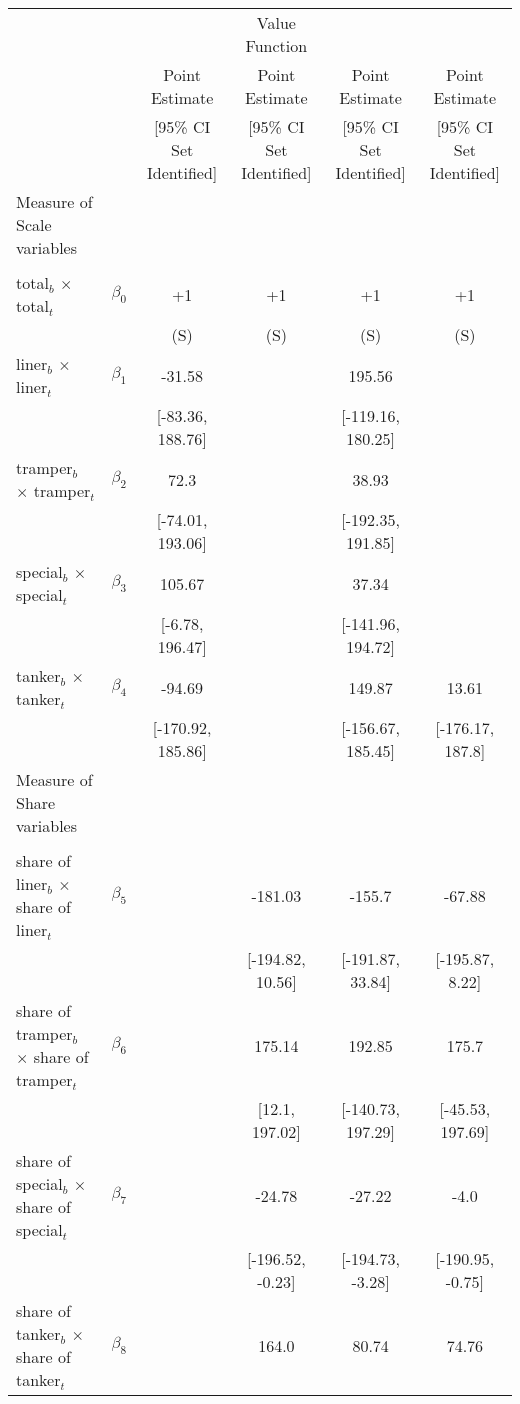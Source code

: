 \begin{tabular}{@{\extracolsep{5pt}}lccccc}
\toprule 
 &  &  & Value Function &  &  \\
 &  & Point Estimate & Point Estimate & Point Estimate & Point Estimate \\
 &  & [95\% CI Set Identified] & [95\% CI Set Identified] & [95\% CI Set Identified] & [95\% CI Set Identified] \\
\midrule 
Measure of Scale variables &  &  &  &  &  \\
 &  &  &  &  \\
total$_{b}$ $\times$ total$_{t}$ & $\beta_0$ & +1 & +1 & +1 & +1 \\
 &  & (S) & (S) & (S) & (S) \\
liner$_{b}$ $\times$ liner$_{t}$ & $\beta_1$ & -31.58 &  & 195.56 &  \\
 &  & [-83.36, 188.76] &  & [-119.16, 180.25] &  \\
tramper$_{b}$ $\times$ tramper$_{t}$ & $\beta_2$ & 72.3 &  & 38.93 &  \\
 &  & [-74.01, 193.06] &  & [-192.35, 191.85] &  \\
special$_{b}$ $\times$ special$_{t}$ & $\beta_3$ & 105.67 &  & 37.34 &  \\
 &  & [-6.78, 196.47] &  & [-141.96, 194.72] &  \\
tanker$_{b}$ $\times$ tanker$_{t}$ & $\beta_4$ & -94.69 &  & 149.87 & 13.61 \\
 &  & [-170.92, 185.86] &  & [-156.67, 185.45] & [-176.17, 187.8] \\
Measure of Share variables &  &  &  &  &  \\
 &  &  &  &  &  \\
share of liner$_{b}$ $\times$ share of liner$_{t}$ & $\beta_5$ &  & -181.03 & -155.7 & -67.88 \\
 &  &  & [-194.82, 10.56] & [-191.87, 33.84] & [-195.87, 8.22] \\
share of tramper$_{b}$ $\times$ share of tramper$_{t}$ & $\beta_6$ &  & 175.14 & 192.85 & 175.7 \\
 &  &  & [12.1, 197.02] & [-140.73, 197.29] & [-45.53, 197.69] \\
share of special$_{b}$ $\times$ share of special$_{t}$ & $\beta_7$ &  & -24.78 & -27.22 & -4.0 \\
 &  &  & [-196.52, -0.23] & [-194.73, -3.28] & [-190.95, -0.75] \\
share of tanker$_{b}$ $\times$ share of tanker$_{t}$ & $\beta_8$ &  & 164.0 & 80.74 & 74.76 \\

\end{tabular}
